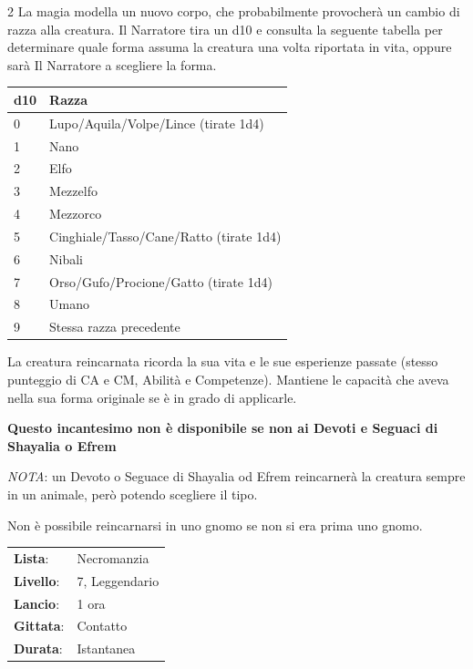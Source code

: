 \begin{multicols}{2}
La magia modella un nuovo corpo, che probabilmente provocherà un cambio di razza alla creatura. Il Narratore tira un d10 e consulta la seguente tabella per determinare quale forma assuma la creatura una volta riportata in vita, oppure sarà Il Narratore a scegliere la forma.

\medskip

\noindent\begin{tabular}{ll}
	\toprule
 \rowcolor{gray!20}\textbf{d10} &\textbf{Razza}\\
	\toprule
	0 & Lupo/Aquila/Volpe/Lince (tirate 1d4)\\
 \rowcolor{gray!20}1&Nano\\
	2&Elfo\\
 \rowcolor{gray!20}3&Mezzelfo\\
	4&Mezzorco\\
 \rowcolor{gray!20}5&Cinghiale/Tasso/Cane/Ratto (tirate 1d4)\\
	6&Nibali\\
 \rowcolor{gray!20}7&Orso/Gufo/Procione/Gatto (tirate 1d4)\\
	8&Umano\\
 \rowcolor{gray!20}9&Stessa razza precedente
\end{tabular}

\medskip

La creatura reincarnata ricorda la sua vita e le sue esperienze passate (stesso punteggio di CA e CM, Abilità e Competenze). Mantiene le capacità che aveva nella sua forma originale se è in grado di applicarle.

\textbf{Questo incantesimo non è disponibile se non ai Devoti e Seguaci di Shayalia o Efrem}

\emph{NOTA}: un Devoto o Seguace di Shayalia od Efrem reincarnerà la creatura sempre in un animale, però potendo scegliere il tipo.

Non è possibile reincarnarsi in uno gnomo se non si era prima uno gnomo.

\noindent\begin{tabularx}{\linewidth}{p{1.9cm}X}
	\rowcolor{gray!20}\textbf{Lista}: & Necromanzia \\
	\textbf{Livello}: & 7, Leggendario \\
	\rowcolor{gray!20}\textbf{Lancio}: & 1 ora \\
	\textbf{Gittata}: & Contatto \\
	\rowcolor{gray!20}\textbf{Durata}: & Istantanea \\
\end{tabularx}\smallskip


\end{multicols}
